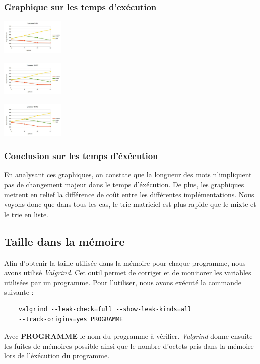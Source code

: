 \subsubsection*{Graphique sur les temps d'exécution}
  \includegraphics [width=30mm]{images/longueur5-15.jpg} \\[0.5cm]
  \begin{spacing}{1.5}
  \includegraphics [width=30mm]{images/longueur15-30.jpg} \\[0.5cm]
  \begin{spacing}{1.5}
  \includegraphics [width=30mm]{images/longueur30-60.jpg} \\[0.5cm]
  \begin{spacing}{1.5}
\subsubsection*{Conclusion sur les temps d'éxécution}
En analysant ces graphiques, on constate que la longueur des mots n'impliquent pas de changement majeur dans le temps d'éxécution.
De plus, les graphiques mettent en relief la différence de coût entre les différentes implémentations.
Nous voyons donc que dans tous les cas, le trie matriciel est plus rapide que le mixte
et le trie en liste.

\subsection{Taille dans la mémoire}
Afin d'obtenir la taille utilisée dans la mémoire pour chaque programme, nous avons
utilisé \emph{Valgrind}. Cet outil permet de corriger et de monitorer les variables
utilisées par un programme. Pour l'utiliser, nous avons exécuté la commande suivante :
\begin{verbatim}
    valgrind --leak-check=full --show-leak-kinds=all
    --track-origins=yes PROGRAMME
\end{verbatim}
Avec \textbf{PROGRAMME} le nom du programme à vérifier. \emph{Valgrind} donne ensuite les fuites
de mémoires possible ainsi que le nombre d'octets pris dans la mémoire lors de
l'éxécution du programme.


\end{spacing}
\end{spacing}
\end{spacing}
